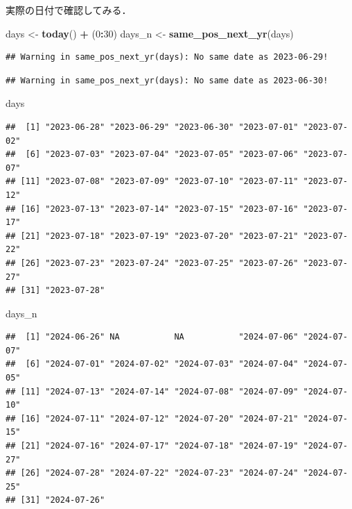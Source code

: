 \documentclass[
]{article}
\newenvironment{Shaded}{\begin{snugshade}}{\end{snugshade}}
\newcommand{\DecValTok}[1]{\textcolor[rgb]{0.00,0.00,0.81}{#1}}
\newcommand{\FunctionTok}[1]{\textcolor[rgb]{0.13,0.29,0.53}{\textbf{#1}}}
\newcommand{\NormalTok}[1]{#1}
\newcommand{\OtherTok}[1]{\textcolor[rgb]{0.56,0.35,0.01}{#1}}
\newcommand{\SpecialCharTok}[1]{\textcolor[rgb]{0.81,0.36,0.00}{\textbf{#1}}}
\begin{document}
実際の日付で確認してみる．

\begin{Shaded}
\begin{Highlighting}[]
\NormalTok{days   }\OtherTok{\textless{}{-}} \FunctionTok{today}\NormalTok{() }\SpecialCharTok{+}\NormalTok{ (}\DecValTok{0}\SpecialCharTok{:}\DecValTok{30}\NormalTok{)}
\NormalTok{days\_n }\OtherTok{\textless{}{-}} \FunctionTok{same\_pos\_next\_yr}\NormalTok{(days)}
\end{Highlighting}
\end{Shaded}

\begin{verbatim}
## Warning in same_pos_next_yr(days): No same date as 2023-06-29!
\end{verbatim}

\begin{verbatim}
## Warning in same_pos_next_yr(days): No same date as 2023-06-30!
\end{verbatim}

\begin{Shaded}
\begin{Highlighting}[]
\NormalTok{days}
\end{Highlighting}
\end{Shaded}

\begin{verbatim}
##  [1] "2023-06-28" "2023-06-29" "2023-06-30" "2023-07-01" "2023-07-02"
##  [6] "2023-07-03" "2023-07-04" "2023-07-05" "2023-07-06" "2023-07-07"
## [11] "2023-07-08" "2023-07-09" "2023-07-10" "2023-07-11" "2023-07-12"
## [16] "2023-07-13" "2023-07-14" "2023-07-15" "2023-07-16" "2023-07-17"
## [21] "2023-07-18" "2023-07-19" "2023-07-20" "2023-07-21" "2023-07-22"
## [26] "2023-07-23" "2023-07-24" "2023-07-25" "2023-07-26" "2023-07-27"
## [31] "2023-07-28"
\end{verbatim}

\begin{Shaded}
\begin{Highlighting}[]
\NormalTok{days\_n}
\end{Highlighting}
\end{Shaded}

\begin{verbatim}
##  [1] "2024-06-26" NA           NA           "2024-07-06" "2024-07-07"
##  [6] "2024-07-01" "2024-07-02" "2024-07-03" "2024-07-04" "2024-07-05"
## [11] "2024-07-13" "2024-07-14" "2024-07-08" "2024-07-09" "2024-07-10"
## [16] "2024-07-11" "2024-07-12" "2024-07-20" "2024-07-21" "2024-07-15"
## [21] "2024-07-16" "2024-07-17" "2024-07-18" "2024-07-19" "2024-07-27"
## [26] "2024-07-28" "2024-07-22" "2024-07-23" "2024-07-24" "2024-07-25"
## [31] "2024-07-26"
\end{verbatim}
\end{document}
